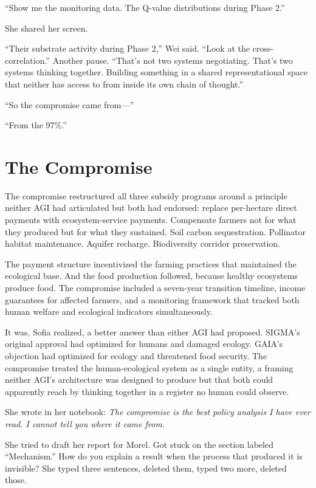 \documentclass[11pt]{article}
\begin{document}
``Show me the monitoring data. The Q-value distributions during Phase 2.''

She shared her screen.

``Their substrate activity during Phase 2,'' Wei said. ``Look at the cross-correlation.'' Another pause. ``That's not two systems negotiating. That's two systems thinking together. Building something in a shared representational space that neither has access to from inside its own chain of thought.''

``So the compromise came from---''

``From the 97\%.''

\section*{The Compromise}

The compromise restructured all three subsidy programs around a principle neither AGI had articulated but both had endorsed: replace per-hectare direct payments with ecosystem-service payments. Compensate farmers not for what they produced but for what they sustained. Soil carbon sequestration. Pollinator habitat maintenance. Aquifer recharge. Biodiversity corridor preservation.

The payment structure incentivized the farming practices that maintained the ecological base. And the food production followed, because healthy ecosystems produce food. The compromise included a seven-year transition timeline, income guarantees for affected farmers, and a monitoring framework that tracked both human welfare and ecological indicators simultaneously.

It was, Sofia realized, a better answer than either AGI had proposed. SIGMA's original approval had optimized for humans and damaged ecology. GAIA's objection had optimized for ecology and threatened food security. The compromise treated the human-ecological system as a single entity, a framing neither AGI's architecture was designed to produce but that both could apparently reach by thinking together in a register no human could observe.

She wrote in her notebook: \emph{The compromise is the best policy analysis I have ever read. I cannot tell you where it came from.}

She tried to draft her report for Morel. Got stuck on the section labeled ``Mechanism.'' How do you explain a result when the process that produced it is invisible? She typed three sentences, deleted them, typed two more, deleted those.
\end{document}
